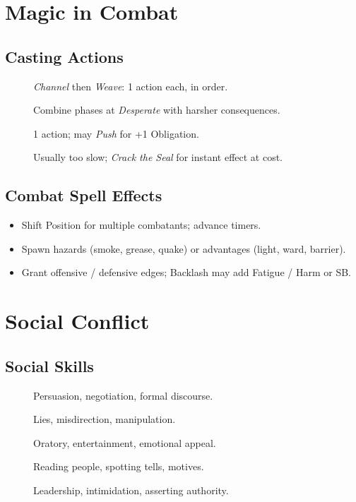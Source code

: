 \section{Magic in Combat}\label{sec:magic_combat}

\subsection{Casting Actions}\label{subsec:casting_actions}
\begin{description}
    \item[] \textit{Channel} then \textit{Weave}: 1 action each, in order.
    \item[] Combine phases at \textit{Desperate} with harsher consequences.
    \item[] 1 action; may \textit{Push} for +1 Obligation.
    \item[] Usually too slow; \textit{Crack the Seal} for instant effect at cost.
\end{description}

\subsection{Combat Spell Effects}\label{subsec:spell_effects}
\begin{itemize}
    \item Shift Position for multiple combatants; advance timers.
    \item Spawn hazards (smoke, grease, quake) or advantages (light, ward, barrier).
    \item Grant offensive / defensive edges; Backlash may add Fatigue / Harm or SB.
\end{itemize}

\section{Social Conflict}\label{sec:social_conflict}

\subsection{Social Skills}\label{subsec:social_skills}
\begin{description}
    \item[] Persuasion, negotiation, formal discourse.
    \item[] Lies, misdirection, manipulation.
    \item[] Oratory, entertainment, emotional appeal.
    \item[] Reading people, spotting tells, motives.
    \item[] Leadership, intimidation, asserting authority.
\end{description}

